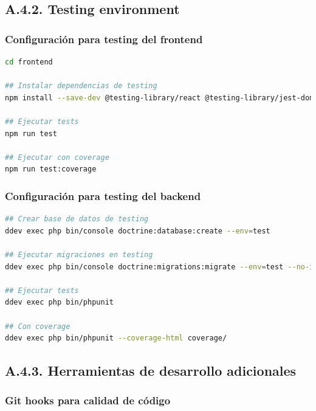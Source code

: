 \documentclass[12pt,a4paper,oneside]{report}
\begin{document}
{\subsection{A.4.2. Testing
environment}\label{a.4.2.-testing-environment}

\subsubsection{Configuración para testing del
frontend}\label{configuraciuxf3n-para-testing-del-frontend}

\begin{lstlisting}[language=bash]
cd frontend

## Instalar dependencias de testing
npm install --save-dev @testing-library/react @testing-library/jest-dom vitest

## Ejecutar tests
npm run test

## Ejecutar con coverage
npm run test:coverage
\end{lstlisting}

\subsubsection{Configuración para testing del
backend}\label{configuraciuxf3n-para-testing-del-backend}

\begin{lstlisting}[language=bash]
## Crear base de datos de testing
ddev exec php bin/console doctrine:database:create --env=test

## Ejecutar migraciones en testing
ddev exec php bin/console doctrine:migrations:migrate --env=test --no-interaction

## Ejecutar tests
ddev exec php bin/phpunit

## Con coverage
ddev exec php bin/phpunit --coverage-html coverage/
\end{lstlisting}

\subsection{A.4.3. Herramientas de desarrollo
adicionales}\label{a.4.3.-herramientas-de-desarrollo-adicionales}

\subsubsection{Git hooks para calidad de
código}\label{git-hooks-para-calidad-de-cuxf3digo}

}
\end{document}
